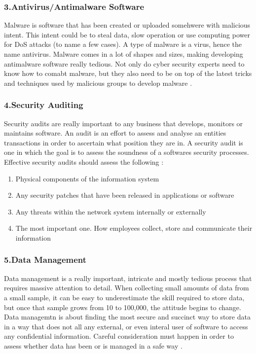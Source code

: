 \documentclass[a4paper, 11pt]{report}
\begin{document}
    \subsubsection{3.Antivirus/Antimalware Software}
    Malware is software that has been created or uploaded somehwere with malicious intent. This intent could be to steal data, slow operation or use computing power for DoS attacks (to name a few cases). A type of malware is a virus, hence the name antivirus. Malware comes in a lot of shapes and sizes, making developing antimalware software really tedious. Not only do cyber security experts need to know how to comabt malware, but they also need to be on top of the latest tricks and techniques used by malicious groups to develop malware \cite{jake3}.
    \subsubsection{4.Security Auditing}
    Security audits are really important to any business that develops, monitors or maintains software. An audit is an effort to assess and analyse an entities transactions in order to ascertain what position they are in. A security audit is one in which the goal is to assess the soundness of a softwares security processes. Effective security audits should assess the following \cite{jake4}:
    \begin{enumerate}
        \item Physical components of the information system
        \item Any security patches that have been released in applications or software
        \item Any threats within the network system internally or externally
        \item The most important one. How employees collect, store and communicate their information
    \end{enumerate}
    \subsubsection{5.Data Management}
    Data management is a really important, intricate and mostly tedious process that requires massive attention to detail. When collecting small amounts of data from a small sample, it can be easy to underestimate the skill required to store data, but once that sample grows from 10 to 100,000, the attitude begins to change. Data managemtn is about finding the most secure and succinct way to store data in a way that does not all any external, or even interal user of software to access any confidential information. Careful consideration must happen in order to assess whether data has been or is managed in a safe way \cite{jake5}.
\end{document}

